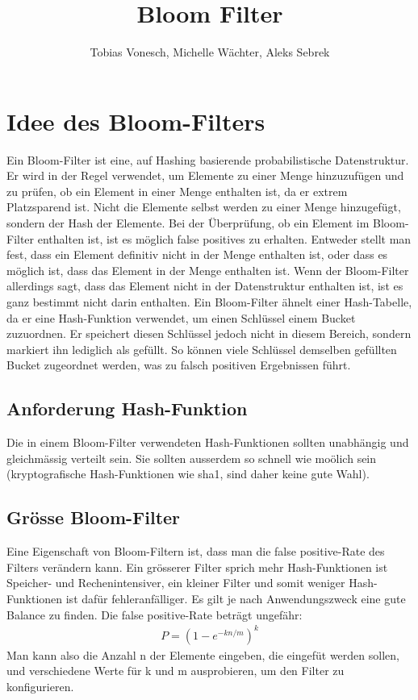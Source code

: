 \documentclass[11pt]{article}
\title{Bloom Filter}
\author{Tobias Vonesch, Michelle Wächter, Aleks Sebrek}
\begin{document}
    \maketitle

    \section{Idee des Bloom-Filters}

    Ein Bloom-Filter ist eine, auf Hashing basierende probabilistische Datenstruktur.
    Er wird in der Regel verwendet, um Elemente zu einer Menge hinzuzuf{\"u}gen und zu pr{\"u}fen, ob ein Element in einer Menge enthalten ist, da er extrem Platzsparend ist.
    Nicht die Elemente selbst werden zu einer Menge hinzugef{\"u}gt, sondern der Hash der Elemente.
    \smallskip
    Bei der {\"U}berpr{\"u}fung, ob ein Element im Bloom-Filter enthalten ist, ist es m{\"o}glich false positives zu erhalten.
    Entweder stellt man fest, dass ein Element definitiv nicht in der Menge enthalten ist, oder dass es m{\"o}glich ist, dass das Element in der Menge enthalten ist.
    Wenn der Bloom-Filter allerdings sagt, dass das Element nicht in der Datenstruktur enthalten ist, ist es ganz bestimmt nicht darin enthalten.
    \smallskip
    Ein Bloom-Filter {\"a}hnelt einer Hash-Tabelle, da er eine Hash-Funktion verwendet, um einen Schl{\"u}ssel einem Bucket zuzuordnen.
    Er speichert diesen Schl{\"u}ssel jedoch nicht in diesem Bereich, sondern markiert ihn lediglich als gef{\"u}llt.
    So k{\"o}nnen viele Schl{\"u}ssel demselben gef{\"u}llten Bucket zugeordnet werden, was zu falsch positiven Ergebnissen f{\"u}hrt.

    \subsection{Anforderung Hash-Funktion}
    Die in einem Bloom-Filter verwendeten Hash-Funktionen sollten unabh{\"a}ngig und gleichm{\"a}ssig verteilt sein.
    Sie sollten ausserdem so schnell wie mo{\"o}lich sein (kryptografische Hash-Funktionen wie sha1, sind daher keine gute Wahl).

    \subsection{Grösse Bloom-Filter}
    Eine Eigenschaft von Bloom-Filtern ist, dass man die false positive-Rate des Filters ver{\"a}ndern kann.
    \newline
    Ein gr{\"o}sserer Filter sprich mehr Hash-Funktionen ist Speicher- und Rechenintensiver, ein kleiner Filter und somit weniger Hash-Funktionen ist daf{\"u}r fehleranf{\"a}lliger.
    Es gilt je nach Anwendungszweck eine gute Balance zu finden.
    \newline
    Die false positive-Rate betr{\"a}gt ungef{\"a}hr:
    \begin{align*}
    P = (1-e^{-kn/m})^k
    \end{align*}
    Man kann also die Anzahl n der Elemente eingeben, die eingef{\"u}t werden sollen, und verschiedene Werte f{\"u}r k und m ausprobieren, um den Filter zu konfigurieren.
\end{document}
